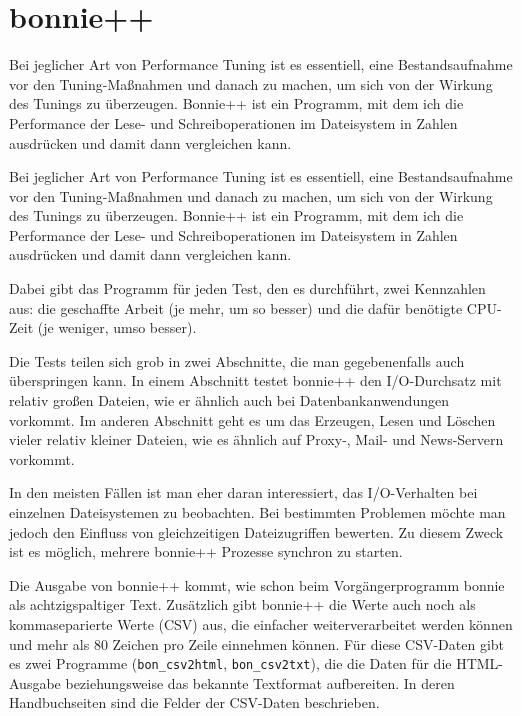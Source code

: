 \section{bonnie++}
\label{sec:lokal-werkzeuge-bonnie}
\begin{abstractsec}
  Bei jeglicher Art von Performance Tuning ist es essentiell, eine
  Bestandsaufnahme vor den Tuning-Maßnahmen und danach zu machen, um sich von
  der Wirkung des Tunings zu überzeugen.
  Bonnie++ ist ein Programm, mit dem ich die Performance der Lese- und
  Schreiboperationen im Dateisystem in Zahlen ausdrücken und damit dann
  vergleichen kann.
\end{abstractsec}
\begin{normaltext}
  Bei jeglicher Art von Performance Tuning ist es essentiell, eine
  Bestandsaufnahme vor den Tuning-Maßnahmen und danach zu machen, um sich von
  der Wirkung des Tunings zu überzeugen.
  Bonnie++ ist ein Programm, mit dem ich die Performance der Lese- und
  Schreiboperationen im Dateisystem in Zahlen ausdrücken und damit dann
  vergleichen kann.

  Dabei gibt das Programm für jeden Test, den es durchführt, zwei Kennzahlen
  aus: die geschaffte Arbeit (je mehr, um so besser) und die dafür benötigte
  CPU-Zeit (je weniger, umso besser).

  Die Tests teilen sich grob in zwei Abschnitte, die man gegebenenfalls auch
  überspringen kann. In einem Abschnitt testet bonnie++ den I/O-Durchsatz mit
  relativ großen Dateien, wie er ähnlich auch bei Datenbankanwendungen
  vorkommt. Im anderen Abschnitt geht es um das Erzeugen, Lesen und Löschen
  vieler relativ kleiner Dateien, wie es ähnlich auf Proxy-, Mail- und
  News-Servern vorkommt.

  In den meisten Fällen ist man eher daran interessiert, das I/O-Verhalten bei
  einzelnen Dateisystemen zu beobachten. Bei bestimmten Problemen möchte man
  jedoch den Einfluss von gleichzeitigen Dateizugriffen bewerten. Zu diesem
  Zweck ist es möglich, mehrere bonnie++ Prozesse synchron zu starten.

  Die Ausgabe von bonnie++ kommt, wie schon beim Vorgängerprogramm bonnie als
  achtzigspaltiger Text. Zusätzlich gibt bonnie++ die Werte auch noch als
  kommaseparierte Werte (CSV) aus, die einfacher weiterverarbeitet werden
  können und mehr als 80 Zeichen pro Zeile einnehmen können. Für diese
  CSV-Daten gibt es zwei Programme (\verb?bon_csv2html?, \verb?bon_csv2txt?),
  die die Daten für die HTML-Ausgabe beziehungsweise das bekannte Textformat
  aufbereiten. In deren Handbuchseiten sind die Felder der CSV-Daten
  beschrieben.


\end{normaltext}
